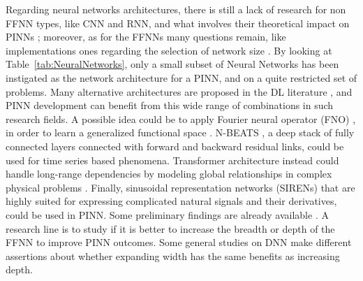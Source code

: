 \documentclass[pdflatex,sn-basic]{sn-jnl}%
\theoremstyle{thmstyleone}%
\theoremstyle{thmstyletwo}%
\theoremstyle{thmstylethree}%
\begin{document}
Regarding neural networks architectures, there is still a lack of research for non FFNN types, like CNN and RNN, and what involves their theoretical impact on PINNs \citep{Wan2022_WhenWhyPinns_YuWYP}; moreover, as for the FFNNs
many questions remain, like implementations ones regarding the selection of network size \citep{Hag2021_NonlocalPhysicsInformed_BekHBMJ}.
By looking at Table~\ref{tab:NeuralNetworks}, only a small subset of Neural Networks has been instigated as the network architecture for a PINN, and on a quite restricted set of problems.
Many alternative architectures are proposed in the DL literature \citep{Dar2020_SurveyDeepLearning_KumDKAK}, 
and PINN development can benefit from this wide range of combinations in such research fields. 
%
A possible idea could be to apply Fourier neural operator (FNO) \citep{Wen2022_UFnoanEnhanced_LiWLA}, in order to learn a generalized functional space \citep{Raf2022_DsfaPinnDeep_RafRRC}. 
N-BEATS \citep{Ore2020_NBeatsNeural_CarOCCB}, a deep stack of fully connected layers connected with forward and backward residual links, could be used for  time series based phenomena.
Transformer architecture instead could handle long-range dependencies by modeling global relationships in complex physical problems \citep{Kas2021_PhysicsInformedMachine_MusKMA}.
%
Finally, sinusoidal representation networks (SIRENs) \cite{Sit2020_ImplicitNeuralRepresentations_MarSMB} that are highly suited for expressing complicated natural signals and their derivatives, could be used in PINN. 
Some preliminary findings are already available \citep{Won2022_LearningSinusoidalSpaces_OoiWOGO, Hua2021_SolvingPartialDifferential_LiuHLS}.
%
%
A research line is to study if it is better to increase the breadth or depth of the FFNN to improve PINN outcomes.
Some general studies on DNN make different assertions about whether expanding width has the same benefits as increasing depth.
\end{document}
